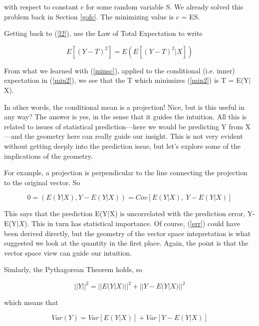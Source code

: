 with respect to constant c for some random variable S.  We already
solved this problem back in Section \ref{gofc}.  The minimizing value 
is c = ES.

Getting back to (\ref{l2}), use the Law of Total Expectation to write

\begin{equation}
\label{min2}
E[{(Y-T)}^2] = E \left (  E[{(Y-T)}^2|X]\right )
\end{equation}

From what we learned with (\ref{minsc}), applied to the conditional
(i.e. inner) expectation in (\ref{min2}), we see that the T which
minimizes (\ref{min2}) is T = E(Y$|$X).  

In other words, the conditional mean is a projection!  Nice, but is this
useful in any way?  The answer is yes, in the sense that it guides the
intuition.  All this is related to issues of statistical
prediction---here we would be predicting Y from X---and the geometry
here can really guide our insight.  This is not very evident without
getting deeply into the prediction issue, but let's explore some of the
implications of the geometry.

For example, a projection is perpendicular to the line connecting the
projection to the original vector.  So

\begin{equation}
\label{err}
0 = (E(Y|X),Y-E(Y|X)) 
= Cov[E(Y|X), ~ Y-E(Y|X)]
\end{equation}

This says that the prediction E(Y$|$X) is uncorrelated with the
prediction error, Y-E(Y$|X$).  This in turn has statistical importance.
Of course, (\ref{err}) could have been derived directly, but the
geometry of the vector space intepretation is what suggested we look at
the quantity in the first place.  Again, the point is that the vector
space view can guide our intuition.

Simlarly, the Pythagorean Theorem holds, so

\begin{equation}
\label{py}
{||Y||}^2 = {||E(Y|X)||}^2 + {||Y-E(Y|X)||}^2
\end{equation}

which means that

\begin{equation}
\label{py2}
Var(Y) = Var[E(Y|X)] + Var[Y-E(Y|X)]
\end{equation}

